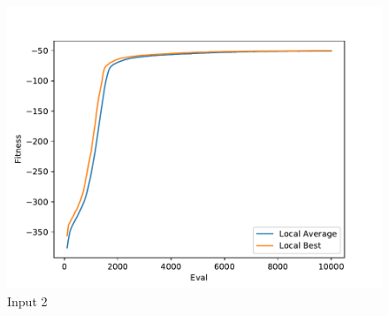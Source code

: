 \documentclass{standalone}
\begin{document}
\begin{figure}[!htb]
	\caption{Input 2}
	\label{fig:graph_2036}
	\includegraphics[width=\textwidth]{../graphs/graphs/2036.pdf}
\end{figure}
\end{document}
